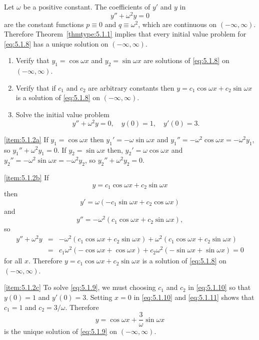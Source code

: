 \documentclass{ximera}
\begin{document}
\begin{example}\label{example:5.1.2}  %
Let $\omega$ be a positive constant. The coefficients of $y'$
and $y$  in
\begin{equation}\label{eq:5.1.8}
y''+\omega^2y=0
\end{equation}
are the constant functions $p\equiv0$ and $q\equiv\omega^2$,
which are continuous on $(-\infty,\infty)$. Therefore
Theorem~\ref{thmtype:5.1.1}
implies that every initial value problem for \eqref{eq:5.1.8}  has a
unique solution on $(-\infty,\infty)$.

\begin{enumerate}
    \item \label{item:5.1.2a}  %
Verify that $y_1=\cos\omega x$ and $y_2=\sin\omega x$ are
solutions of \eqref{eq:5.1.8} on $(-\infty,\infty)$.
\item \label{item:5.1.2b}  %
Verify that if $c_1$ and $c_2$ are arbitrary constants then
$y=c_1\cos\omega x+c_2\sin\omega x$ is a solution of \eqref{eq:5.1.8}
on $(-\infty,\infty)$.
\item \label{item:5.1.2c} %
Solve the initial value problem
\begin{equation}\label{eq:5.1.9}
y''+\omega^2y=0,\quad y(0)=1,\quad y'(0)=3.
\end{equation}
\end{enumerate}
\begin{explanation}
\ref{item:5.1.2a} If $y_1=\cos\omega x$ then $y_1'=-\omega\sin\omega x$
and
$y_1''=-\omega^2\cos\omega x=-\omega^2y_1$, so  $y_1''+\omega^2y_1=0$.
If $y_2=\sin\omega x$ then, $y_2'=\omega\cos\omega x$ and
$y_2''=-\omega^2\sin\omega x=-\omega^2y_2$, so  $y_2''+\omega^2y_2=0$.

\ref{item:5.1.2b} If
\begin{equation}\label{eq:5.1.10}
y=c_1\cos\omega x+c_2\sin\omega x
\end{equation}
 then
\begin{equation}\label{eq:5.1.11}
y'=\omega(-c_1\sin\omega x+c_2\cos\omega x)
\end{equation}
and
$$
y''=-\omega^2(c_1\cos\omega x+c_2\sin\omega x),
$$
so
\begin{eqnarray*}
y''+\omega^2y&=& -\omega^2(c_1\cos\omega x+c_2\sin\omega x)
+\omega^2(c_1\cos\omega x+c_2\sin\omega x)\\
&=&c_1\omega^2(-\cos\omega x+\cos\omega x)+
c_2\omega^2(-\sin\omega x+\sin\omega x)=0
\end{eqnarray*}
for all $x$. Therefore $y=c_1\cos\omega x+c_2\sin\omega x$ is a
solution of \eqref{eq:5.1.8} on $(-\infty,\infty)$.

\ref{item:5.1.2c}
To solve
\eqref{eq:5.1.9}, we must choosing $c_1$ and $c_2$ in \eqref{eq:5.1.10}
so that $y(0)=1$ and $y'(0)=3$. Setting $x=0$ in \eqref{eq:5.1.10}
and \eqref{eq:5.1.11} shows that $c_1=1$ and $c_2=3/\omega$.
Therefore
$$
y=\cos\omega x+\frac{3}{\omega}\sin\omega x
$$
 is the unique solution of \eqref{eq:5.1.9} on
$(-\infty,\infty)$.
\end{explanation}
\end{example}
\end{document}
